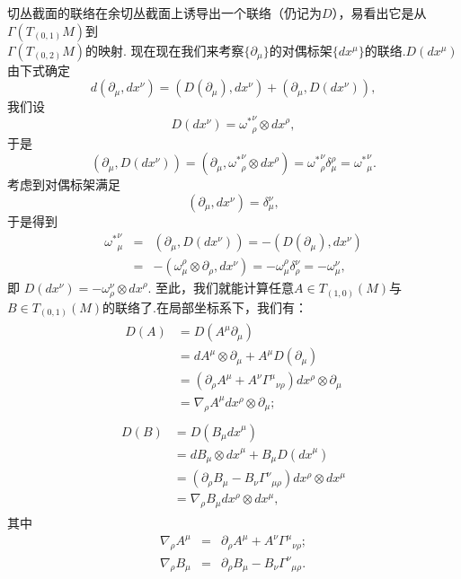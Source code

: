 		切丛截面的联络在余切丛截面上诱导出一个联络（仍记为$D$），易看出它是从$\varGamma(T_{(0,1)}M)$到\\$\varGamma(T_{(0,2)}M)$的映射.
		现在现在我们来考察$\{\partial_\mu\}$的对偶标架$\{dx^\mu\}$的联络.$D(dx^\mu)$由下式确定
		$$d\left(\partial_\mu,dx^\nu\right)=\left(D(\partial_\mu),dx^\nu\right)+\left(\partial_\mu,D(dx^\nu)\right),$$
		我们设
		$$D(dx^\nu)={\omega^*}^\nu_\rho\otimes{dx}^\rho,$$
		于是
		$$\left(\partial_\mu,D(dx^\nu)\right)=\left(\partial_\mu,{\omega^*}^\nu_\rho\otimes{dx}^\rho\right)={\omega^*}^\nu_\rho\delta^\rho_\mu={\omega^*}^\nu_\mu.$$
		考虑到对偶标架满足
		$$\left(\partial_\mu,dx^\nu\right)=\delta^\nu_\mu,$$ 
		于是得到
		\begin{eqnarray}
			{\omega^*}^\nu_\mu&=&\left(\partial_\mu,D(dx^\nu)\right)=-\left(D(\partial_\mu),dx^\nu\right)\\
				&=&-\left(\omega^\rho_\mu\otimes\partial_\rho,dx^\nu\right)=-{\omega}^\rho_\mu\delta^\nu_\rho=-{\omega}^\nu_\mu,
		\end{eqnarray}
		即
		$D(dx^\nu)=-{\omega}^\nu_\rho\otimes{dx}^\rho$.
		至此，我们就能计算任意$A\in T_{(1,0)}(M)$与$B\in T_{(0,1)}(M)$的联络了.在局部坐标系下，我们有：			\begin{eqnarray}
			\begin{split}
				D(A)&=D(A^\mu\partial_\mu)\\
				&=dA^\mu\otimes\partial_\mu+A^{\mu}D(\partial_\mu)\\
				&=(\partial_{\rho}A^\mu+A^{\nu}{\varGamma^\mu}_{\nu\rho})dx^\rho{\otimes}\partial_\mu\\
				&=\nabla_{\rho}A^{\mu}dx^\rho{\otimes}\partial_\mu;
			\end{split}
		\end{eqnarray}
		\begin{eqnarray}
			\begin{split}
				D(B)&=D(B_{\mu}{dx}^\mu)\\
				&=dB_\mu\otimes{dx}^\mu+B_{\mu}D({dx}^\mu)\\
				&=(\partial_{\rho}B_\mu-B_\nu{\varGamma^\nu}_{\mu\rho})dx^\rho{\otimes}dx^\mu\\
				&=\nabla_{\rho}B_{\mu}dx^\rho{\otimes}dx^\mu,
			\end{split}
		\end{eqnarray}
		其中
		\begin{eqnarray}
			\nabla_{\rho}A^\mu&=&\partial_{\rho}A^\mu+A^{\nu}{\varGamma^\mu}_{\nu\rho};\\
				\nabla_{\rho}B_{\mu}&=&\partial_{\rho}B_\mu-B_\nu{\varGamma^\nu}_{\mu\rho}.
		\end{eqnarray}							
